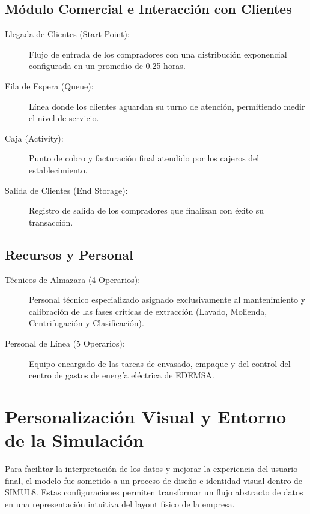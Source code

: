 \documentclass[runningheads]{llncs}
\begin{document}
\subsection{Módulo Comercial e Interacción con Clientes}
\begin{description}
    \item[Llegada de Clientes (Start Point):] Flujo de entrada de los compradores con una distribución exponencial configurada en un promedio de 0.25 horas.
    \item[Fila de Espera (Queue):] Línea donde los clientes aguardan su turno de atención, permitiendo medir el nivel de servicio.
    \item[Caja (Activity):] Punto de cobro y facturación final atendido por los cajeros del establecimiento.
    \item[Salida de Clientes (End Storage):] Registro de salida de los compradores que finalizan con éxito su transacción.
\end{description}

\subsection{Recursos y Personal}
\begin{description}
    \item[Técnicos de Almazara (4 Operarios):] Personal técnico especializado asignado exclusivamente al mantenimiento y calibración de las fases críticas de extracción (Lavado, Molienda, Centrifugación y Clasificación).
    \item[Personal de Línea (5 Operarios):] Equipo encargado de las tareas de envasado, empaque y del control del centro de gastos de energía eléctrica de EDEMSA.
\end{description}


\section{Personalización Visual y Entorno de la Simulación}

Para facilitar la interpretación de los datos y mejorar la experiencia del usuario final, el modelo fue sometido a un proceso de diseño e identidad visual dentro de SIMUL8. Estas configuraciones permiten transformar un flujo abstracto de datos en una representación intuitiva del layout físico de la empresa.
\end{document}
